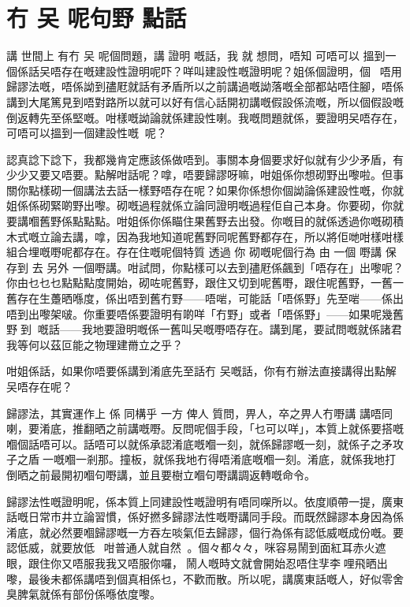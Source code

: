 \chapter{冇 㕦 呢句野 點話}
講 世間上 有冇 㕦 呢個問題，講 證明 嘅話，我 就 想問，唔知 可唔可以 搵到一個係話㕦唔存在嘅建設性證明呢吓？咩叫建設性嘅證明呢？姐係個證明，個，唔用歸謬法嘅，唔係詏到孻屘就話有矛盾所以之前講過嘅詏落嘅全部都站唔住腳，唔係講到大尾篤見到唔對路所以就可以好有信心話開初講嘅假設係流嘅，所以個假設嘅倒返轉先至係堅嘅。咁樣嘅詏論就係建設性喇。我嘅問題就係，要證明㕦唔存在，可唔可以搵到一個建設性嘅呢？

認真諗下諗下，我都幾肯定應該係做唔到。事關本身個要求好似就有少少矛盾，有少少又要又唔要。點解咁話呢？嗱，唔要歸謬呀嘛，咁姐係你想砌野出嚟啦。但事關你點樣砌一個講法去話一樣野唔存在呢？如果你係想你個詏論係建設性嘅，你就姐係係砌緊啲野出嚟。砌嘅過程就係立論同證明嘅過程佢自己本身。你要砌，你就要講嗰舊野係點點點。咁姐係你係瞄住果舊野去出發。你嘅目的就係透過你嘅砌積木式嘅立論去講，嗱，因為我地知道呢舊野同呢舊野都存在，所以將佢哋咁樣咁樣組合埋嘅嘢呢都存在。存在住嘅呢個特質 透過 你 砌嘅呢個行為 由 一個 嘢講 保存到 去 另外 一個嘢講。咁試問，你點樣可以去到孻屘係飆到「唔存在」出嚟呢？你由乜乜乜點點點度開始，砌咗呢舊野，跟住又切到呢舊嘢，跟住呢舊野，一舊一舊存在生躉晒喺度，係出唔到舊冇野——唔啱，可能話「唔係野」先至啱——係出唔到出嚟架啵。你重要唔係要證明有啲咩「冇野」或者「唔係野」——如果呢幾舊野到嘅話——我地要證明嘅係一舊叫㕦嘅嘢唔存在。講到尾，要試問嘅就係諸君我等何以茲叵能之物理建黹立之乎？

咁姐係話，如果你唔要係講到淆底先至話冇 㕦嘅話，你有冇辦法直接講得出點解㕦唔存在呢？

歸謬法，其實運作上 係 同構乎 一方 俾人 質問，畀人，卒之畀人冇嘢講 講唔同喇，要淆底，推翻晒之前講嘅嘢。反問呢個手段，「乜可以咩」，本質上就係要搭嘅嗰個話唔可以。話唔可以就係承認淆底嘅嗰一刻，就係歸謬嘅一刻，就係子之矛攻子之盾一嘅嗰一剎那。撞板，就係我地冇得唔淆底嘅嗰一刻。淆底，就係我地打倒晒之前最開初嗰句嘢講，並且要樹立嗰句嘢講調返轉嘅命令。

歸謬法性嘅證明呢，係本質上同建設性嘅證明有唔同㗎所以。依度順帶一提，廣東話嘅日常市井立論習慣，係好撚多歸謬法性嘅嘢講同手段。而既然歸謬本身因為係淆底，就必然要嗰歸謬嘅一方吞左啖氣佢去歸謬，個行為係有認低威嘅成份嘅。要認低威，就要放低，咁普通人就自然󱛒󰸒。個々都々々，咪容易鬧到面紅耳赤火遮眼，跟住你又唔服我我又唔服你囉，鬧人嘅時文就會開始忍唔住𩇫李𫸴哩飛晒出嚟，最後未都係講唔到個真相係乜，不歡而散。所以呢，講廣東話嘅人，好似零舍臭脾氣就係有部份係喺依度嚟。

